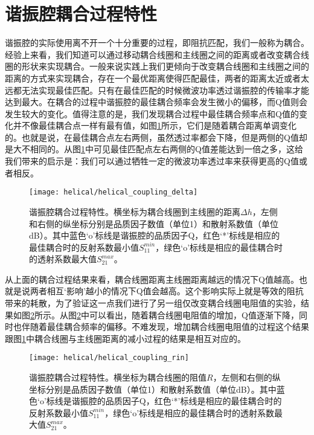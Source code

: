 \section{谐振腔耦合过程特性}
谐振腔的实际使用离不开一个十分重要的过程，即阻抗匹配，我们一般称为耦合。经验上来看，我们知道可以通过移动耦合线圈和主线圈之间的距离或者改变耦合线圈的形状来实现耦合。一般来说实践上我们更倾向于改变耦合线圈和主线圈之间的距离的方式来实现耦合，存在一个最优距离使得匹配最佳，两者的距离太近或者太远都无法实现最佳匹配。只有在最佳匹配的时候微波功率透过谐振腔的传输率才能达到最大。在耦合的过程中谐振腔的最佳耦合频率会发生微小的偏移，而Q值则会发生较大的变化。值得注意的是，我们发现耦合过程中最佳耦合频率点和Q值的变化并不像最佳耦合点一样有最有值，如图\ref{fig:helical_coupling_delta}所示，它们是随着耦合距离单调变化的。也就是说，在最佳耦合点左右两侧，虽然透过率都会下降，但是两侧的Q值却是大不相同的。从图\ref{fig:helical_coupling_delta}中可见最佳匹配点左右两侧的Q值差能达到一倍之多，这给我们带来的启示是：我们可以通过牺牲一定的微波功率透过率来获得更高的Q值或者相反。
\begin{figure}
    \centering
    \caption[谐振腔耦合过程特性]{谐振腔耦合过程特性。横坐标为耦合线圈到主线圈的距离$\Delta h$，左侧和右侧的纵坐标分别是品质因子数值（单位1）和散射系数值（单位dB）。其中蓝色‘o’标线是谐振腔的品质因子Q，红色‘*’标线是相应的最佳耦合时的反射系数最小值$S_{11}^{min}$，绿色‘o’标线是相应的最佳耦合时的透射系数最大值$S_{21}^{max}$。\label{fig:helical_coupling_delta}}
    \texttt{[image: helical/helical\_coupling\_delta]}
\end{figure}

从上面的耦合过程结果来看，耦合线圈距离主线圈距离越远的情况下Q值越高。也就是说两者相互‘影响’越小的情况下Q值会越高。这个影响实际上就是等效的阻抗带来的耗散，为了验证这一点我们进行了另一组仅改变耦合线圈电阻值的实验，结果如图\ref{fig:helical_coupling_rin}所示。从图\ref{fig:helical_coupling_rin}中可以看出，随着耦合线圈电阻值的增加，Q值逐渐下降，同时也伴随着最佳耦合频率的偏移。不难发现，增加耦合线圈电阻值的过程这个结果跟图\ref{fig:helical_coupling_delta}中耦合线圈与主线圈距离的减小过程的结果是相互对应的。
\begin{figure}
    \centering
    \caption[谐振腔耦合过程特性]{谐振腔耦合过程特性。横坐标为耦合线圈的阻值$R$，左侧和右侧的纵坐标分别是品质因子数值（单位1）和散射系数值（单位dB）。其中蓝色‘o’标线是谐振腔的品质因子Q，红色‘*’标线是相应的最佳耦合时的反射系数最小值$S_{11}^{min}$，绿色‘o’标线是相应的最佳耦合时的透射系数最大值$S_{21}^{max}$。\label{fig:helical_coupling_rin}}
    \texttt{[image: helical/helical\_coupling\_rin]}
\end{figure}


